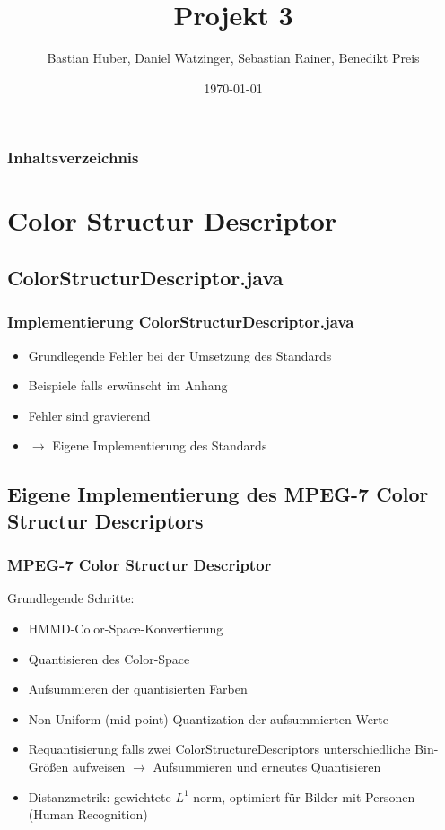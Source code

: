 \documentclass[11pt]{beamer}
\begin{document}
\graphicspath{{img/}}

\title[Multimedia Datenbanken]{Projekt 3}
\subtitle[Multimedia Datenbanken]{}
\author[Bastian Huber et al.]{Bastian Huber, Daniel Watzinger, Sebastian Rainer, Benedikt Preis}
\date{\today}

\frame{
	\titlepage
}

\begin{frame}
	\frametitle{Inhaltsverzeichnis}
	\tableofcontents
\end{frame}

\section{Color Structur Descriptor}
\subsection{ColorStructurDescriptor.java}
\begin{frame}
	\frametitle{Implementierung ColorStructurDescriptor.java}
	\begin{itemize}
		\item Grundlegende Fehler bei der Umsetzung des Standards
		\item Beispiele falls erwünscht im Anhang
		\item Fehler sind gravierend
		\item $\rightarrow$ Eigene Implementierung des Standards
	\end{itemize}
\end{frame}

\subsection{Eigene Implementierung des MPEG-7 Color Structur Descriptors}
\begin{frame}
	\frametitle{MPEG-7 Color Structur Descriptor}
	Grundlegende Schritte:
	\begin{itemize}
		\item HMMD-Color-Space-Konvertierung
		\item Quantisieren des Color-Space
		\item Aufsummieren der quantisierten Farben
		\item Non-Uniform (mid-point) Quantization der aufsummierten Werte
		\item Requantisierung falls zwei ColorStructureDescriptors unterschiedliche Bin-Größen aufweisen $\rightarrow$ Aufsummieren und erneutes Quantisieren
		\item Distanzmetrik: gewichtete $L^1$-norm, optimiert für Bilder mit Personen (Human Recognition)
	\end{itemize}
\end{frame}
\end{document}
